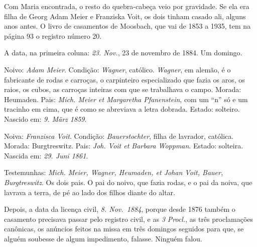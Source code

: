 \documentclass[
  brazilian,
  11pt,
  openany]{book}
\begin{document}
Com Maria encontrada, o resto do quebra-cabeça veio por gravidade. Se
ela era filha de Georg Adam Meier e Franziska Voit, os dois tinham
casado ali, alguns anos antes. O livro de casamentos de Moosbach, que
vai de 1853 a 1935, tem na página 93 o registro número 20.

A data, na primeira coluna: \emph{23. Nov.}, 23 de novembro de 1884. Um
domingo.

Noivo: \emph{Adam Meier}. Condição: \emph{Wagner}, católico.
\emph{Wagner}, em alemão, é o fabricante de rodas e carroças, o
carpinteiro especializado que fazia os aros, os raios, os cubos, as
carroças inteiras com que se trabalhava o campo. Morada: Heumaden. Pais:
\emph{Mich. Meier et Margaretha Pfanenstein}, com um ``n'' só e um
tracinho em cima, que é como se abreviava a letra dobrada. Estado:
solteiro. Nascido em: \emph{9. März 1859}.

Noiva: \emph{Franzisca Voit}. Condição: \emph{Bauerstochter}, filha de
lavrador, católica. Morada: Burgtreswitz. Pais: \emph{Joh. Voit et
Barbara Woppman}. Estado: solteira. Nascida em: \emph{29. Juni 1861}.

Testemunhas: \emph{Mich. Meier, Wagner, Heumaden, et Johan Voit, Bauer,
Burgtreswitz}. Os dois pais. O pai do noivo, que fazia rodas, e o pai da
noiva, que lavrava a terra, de pé ao lado dos filhos diante do altar.

Depois, a data da licença civil, \emph{8. Nov.~1884}, porque desde 1876
também o casamento precisava passar pelo registro civil, e as \emph{3
Procl.}, as três proclamações canônicas, os anúncios feitos na missa em
três domingos seguidos para que, se alguém soubesse de algum
impedimento, falasse. Ninguém falou.
\end{document}
